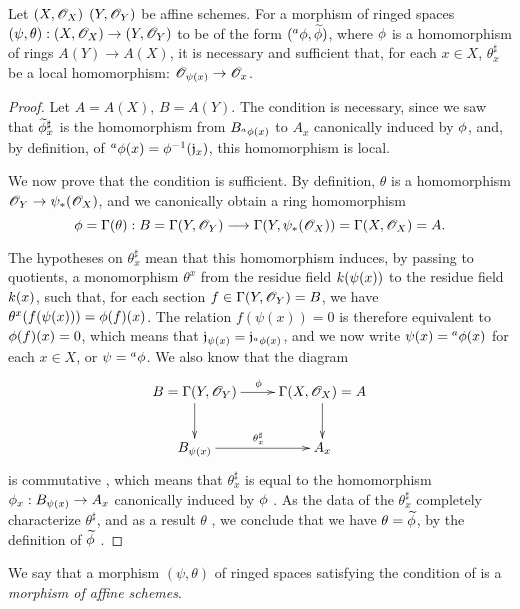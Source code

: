 \begin{thm}[1.7.3]
\label{1.1.7.3}
Let $(X,\mathscr{O}_X)$  $(Y,\mathscr{O}_Y)$ be affine schemes.
For a morphism of ringed spaces $(\psi,\theta):(X,\OO_X)\to(Y,\OO_Y)$ to be of the form $({}^a\phi,{\widetilde{\phi}})$, where $\phi$ is a homomorphism of rings $A(Y)\to A(X)$, it is necessary and sufficient that, for each $x\in X$, $\theta_x^\sharp$ be a local homomorphism: $\OO_{\psi(x)}\to\OO_x$.
\end{thm}

\begin{proof}
\label{proof-1.1.7.3}
Let $A=A(X)$, $B=A(Y)$.
The condition is necessary, since we saw  that ${\widetilde{\phi}}_x^\sharp$ is the homomorphism from $B_{{}^a\phi(x)}$ to $A_x$ canonically induced by $\phi$, and, by definition, of ${}^a\phi(x)=\phi^{-1}(\mathfrak{j}_x)$, this homomorphism is local.

We now prove that the condition is sufficient.
By definition, $\theta$ is a homomorphism $\OO_Y\to\psi_*(\OO_X)$, and we canonically obtain a ring homomorphism
\[
  \vphi=\Gamma(\theta):B=\Gamma(Y,\OO_Y)
  \to\Gamma(Y,\psi_*(\OO_X))=\Gamma(X,\OO_X)=A.
\]

The hypotheses on $\theta_x^\sharp$ mean that this homomorphism induces, by passing to quotients, a monomorphism $\theta^x$ from the residue field $k(\psi(x))$ to the residue field $k(x)$, such that, for each section $f\in\Gamma(Y,\mathscr{O}_Y)=B$, we have $\theta^x(f(\psi(x)))=\phi(f)(x)$.
The relation $f(\psi(x))=0$ is therefore equivalent to $\phi(f)(x)=0$, which means that $\mathfrak{j}_{\psi(x)}=\mathfrak{j}_{{}^a\phi(x)}$, and we now write $\psi(x)={}^a\phi(x)$ for each $x\in X$, or $\psi={}^a\phi$.
We also know that the diagram
\[
  \xymatrix{
    B=\Gamma(Y,\OO_Y)\ar[r]^\vphi\ar[d] &
    \Gamma(X,\OO_X)=A\ar[d]\\
    B_{\psi(x)}\ar[r]^{\theta_x^\sharp} &
    A_x
  }
\]
is commutative , which means that $\theta_x^\sharp$ is equal to the homomorphism $\vphi_x:B_{\psi(x)}\to A_x$ canonically induced by $\phi$ .
As the data of the $\theta_x^\sharp$ completely characterize $\theta^\sharp$, and as a result $\theta$ , we conclude that we have $\theta={\widetilde{\phi}}$, by the definition of ${\widetilde{\phi}}$ .
\end{proof}

We say that a morphism $(\psi,\theta)$ of ringed spaces satisfying the condition of  is a \emph{morphism of affine schemes}.

